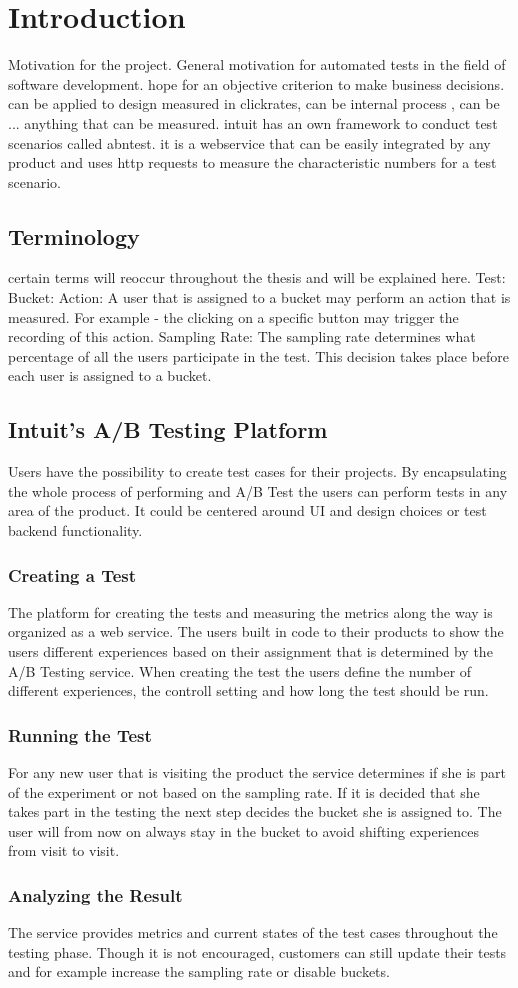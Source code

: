 \documentclass[main.tex]{subfiles}
\begin{document}
\chapter{Introduction}
Motivation for the project. General motivation for automated tests in the field of software development. hope for an objective criterion to make business decisions. can be applied to design measured in clickrates, can be internal process , can be ... anything that can be measured. intuit has an own framework to conduct test scenarios called abntest. it is a webservice that can be easily integrated by any product and uses http requests to measure the characteristic numbers for a test scenario.
\section{Terminology}
certain terms will reoccur throughout the thesis and will be explained here.
Test:
Bucket:
Action: A user that is assigned to a bucket may perform an action that is measured. For example - the clicking on a specific button may trigger the recording of this action. 
Sampling Rate: The sampling rate determines what percentage of all the users participate in the test. This decision takes place before each user is assigned to a bucket.
\section{Intuit's A/B Testing Platform}
Users have the possibility to create test cases for their projects. By encapsulating the whole process of performing and A/B Test the users can perform tests in any area of the product. It could be centered around UI and design choices or test backend functionality.
\subsection{Creating a Test} 
The platform for creating the tests and measuring the metrics along the way is organized as a web service. The users built in code to their products to show the users different experiences based on their assignment that is determined by the A/B Testing service. When creating the test the users define the number of different experiences, the controll setting and how long the test should be run.
\subsection{Running the Test}
For any new user that is visiting the product the service determines if she is part of the experiment or not based on the sampling rate. If it is decided that she takes part in the testing the next step decides the bucket she is assigned to. The user will from now on always stay in the bucket to avoid shifting experiences from visit to visit.
\subsection{Analyzing the Result}
The service provides metrics and current states of the test cases throughout the testing phase. Though it is not encouraged, customers can still update their tests and for example increase the sampling rate or disable buckets.
\end{document}
